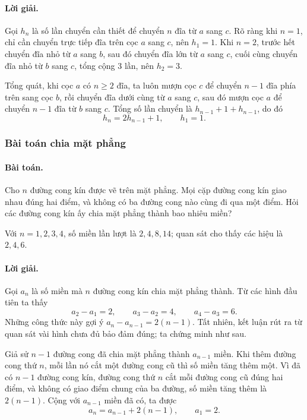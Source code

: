 \documentclass[11pt]{article}
\begin{document}
\paragraph{Lời giải.}
Gọi \(h_n\) là số lần chuyển cần thiết để chuyển \(n\) đĩa từ \(a\) sang
\(c\). Rõ ràng khi \(n=1\), chỉ cần chuyển trực tiếp đĩa trên cọc \(a\) sang
\(c\), nên \(h_1=1\). Khi \(n=2\), trước hết chuyển đĩa nhỏ từ \(a\) sang
\(b\), sau đó chuyển đĩa lớn từ \(a\) sang \(c\), cuối cùng chuyển đĩa nhỏ từ
\(b\) sang \(c\), tổng cộng \(3\) lần, nên \(h_2=3\).

Tổng quát, khi cọc \(a\) có \(n\ge2\) đĩa, ta luôn mượn cọc \(c\) để chuyển
\(n-1\) đĩa phía trên sang cọc \(b\), rồi chuyển đĩa dưới cùng từ \(a\) sang
\(c\), sau đó mượn cọc \(a\) để chuyển \(n-1\) đĩa từ \(b\) sang \(c\). Tổng
số lần chuyển là \(h_{n-1}+1+h_{n-1}\), do đó
\[
  h_n=2h_{n-1}+1,\qquad h_1=1.
\]

\subsubsection{Bài toán chia mặt phẳng}

\paragraph{Bài toán.}
Cho \(n\) đường cong kín được vẽ trên mặt phẳng. Mọi cặp đường cong kín giao
nhau đúng hai điểm, và không có ba đường cong nào cùng đi qua một điểm. Hỏi
các đường cong kín ấy chia mặt phẳng thành bao nhiêu miền?

Với \(n=1,2,3,4\), số miền lần lượt là \(2,4,8,14\); quan sát cho thấy các
hiệu là \(2,4,6\).

\paragraph{Lời giải.}
Gọi \(a_n\) là số miền mà \(n\) đường cong kín chia mặt phẳng thành. Từ các
hình đầu tiên ta thấy
\[
  a_2-a_1=2,\qquad a_3-a_2=4,\qquad a_4-a_3=6.
\]
Những công thức này gợi ý \(a_n-a_{n-1}=2(n-1)\). Tất nhiên, kết luận rút ra
từ quan sát vài hình chưa đủ bảo đảm đúng; ta chứng minh như sau.

Giả sử \(n-1\) đường cong đã chia mặt phẳng thành \(a_{n-1}\) miền. Khi thêm
đường cong thứ \(n\), mỗi lần nó cắt một đường cong cũ thì số miền tăng thêm
một. Vì đã có \(n-1\) đường cong kín, đường cong thứ \(n\) cắt mỗi đường cong
cũ đúng hai điểm, và không có giao điểm chung của ba đường, số miền tăng thêm
là \(2(n-1)\). Cộng với \(a_{n-1}\) miền đã có, ta được
\[
  a_n=a_{n-1}+2(n-1),\qquad a_1=2.
\]
\end{document}
